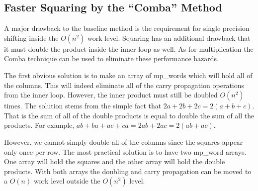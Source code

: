 \documentclass[b5paper]{book}
\begin{document}
\subsection{Faster Squaring by the ``Comba'' Method}
A major drawback to the baseline method is the requirement for single precision shifting inside the $O(n^2)$ work level.  Squaring has an additional
drawback that it must double the product inside the inner loop as well.  As for multiplication the Comba technique can be used to eliminate these
performance hazards.

The first obvious solution is to make an array of mp\_words which will hold all of the columns.  This will indeed eliminate all of the carry
propagation operations from the inner loop.  However, the inner product must still be doubled $O(n^2)$ times.  The solution stems from the simple fact
that $2a + 2b + 2c = 2(a + b + c)$.  That is the sum of all of the double products is equal to double the sum of all the products.  For example,
$ab + ba + ac + ca = 2ab + 2ac = 2(ab + ac)$.  

However, we cannot simply double all of the columns since the squares appear only once per row.  The most practical solution is to have two mp\_word
arrays.  One array will hold the squares and the other array will hold the double products.  With both arrays the doubling and carry propagation can be 
moved to a $O(n)$ work level outside the $O(n^2)$ level.  
\end{document}
